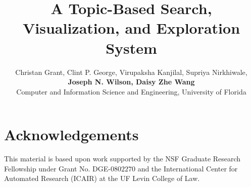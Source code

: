\documentclass[letterpaper]{article}
\begin{document}
\title{A Topic-Based Search, Visualization, and Exploration System}
\author{Christan Grant, Clint P. George, Virupaksha Kanjilal, Supriya Nirkhiwale, \\ 
{\bf \Large Joseph N. Wilson, Daisy Zhe Wang}\\
Computer and Information Science and Engineering, University of Florida}

\maketitle










\section{Acknowledgements}

This material is based upon work supported by the NSF Graduate 
Research Fellowship under Grant No. 
DGE-$0802270$ and the International Center for Automated 
Research (ICAIR) at the UF Levin College of Law. 




\end{document}
